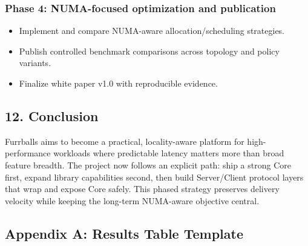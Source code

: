 \documentclass[
  english,
  letterpaper,
  DIV=11,
  numbers=noendperiod]{scrartcl}
\providecommand{\tightlist}{%
  \setlength{\itemsep}{0pt}\setlength{\parskip}{0pt}}
\begin{document}
\subsubsection{Phase 4: NUMA-focused optimization and
publication}\label{phase-4-numa-focused-optimization-and-publication}

\begin{itemize}
\tightlist
\item
  Implement and compare NUMA-aware allocation/scheduling strategies.
\item
  Publish controlled benchmark comparisons across topology and policy
  variants.
\item
  Finalize white paper v1.0 with reproducible evidence.
\end{itemize}

\subsection{12. Conclusion}\label{conclusion}

Furrballs aims to become a practical, locality-aware platform for
high-performance workloads where predictable latency matters more than
broad feature breadth. The project now follows an explicit path: ship a
strong Core first, expand library capabilities second, then build
Server/Client protocol layers that wrap and expose Core safely. This
phased strategy preserves delivery velocity while keeping the long-term
NUMA-aware objective central.

\subsection{Appendix A: Results Table
Template}\label{appendix-a-results-table-template}
\end{document}
